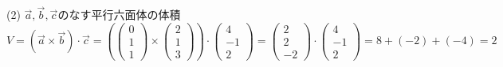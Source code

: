 \documentclass[fleqn]{jsarticle}
\begin{document}
\begin{description}
\begin{spacing}{1.2}
            \item[(2)]
                $ \vec{a},\vec{b},\vec{c} $のなす平行六面体の体積 \\
                $ V =
                (\vec{a} \times \vec{b}) \cdot \vec{c}
                =
                (
                    \left(
                        \begin{array}{c}
                            0 \\
                            1 \\
                            1
                        \end{array}
                    \right)
                    \times
                    \left(
                        \begin{array}{c}
                            2 \\
                            1 \\
                            3
                        \end{array}
                    \right)
                )
                \cdot
                \left(
                    \begin{array}{c}
                        4 \\
                        -1 \\
                        2
                    \end{array}
                \right)
                =
                \left(
                    \begin{array}{c}
                        2 \\
                        2 \\
                        -2
                    \end{array}
                \right)
                \cdot
                \left(
                    \begin{array}{c}
                        4 \\
                        -1 \\
                        2
                    \end{array}
                \right)
                = 8 + (-2) + (-4)
                = 2
                $


\end{spacing}
\end{description}
\end{document}
